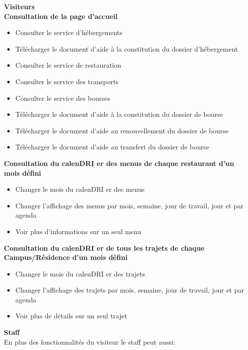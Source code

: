     \textbf{Visiteurs\\}
        \textbf{Consultation de la page d’accueil}
        \begin{itemize}
            \item Consulter le service d'hébergements
            \item Télécharger le document d'aide à la constitution du dossier d'hébergement
            \item Consulter le service de restauration
            \item Consulter le service des transports
            \item Consulter le service des bourses
            \item Télécharger le document d'aide à la constitution du dossier de bourse
            \item Télécharger le document d'aide au renouvellement du dossier de bourse
            \item Télécharger le document d'aide au transfert du dossier de bourse\\
        \end{itemize}

        \textbf{Consultation du calen\acs{DRI} er des menus de chaque restaurant d'un mois défini}
        \begin{itemize}
            \item Changer le mois du calen\acs{DRI} er des menus
            \item Changer l'affichage des menus par mois, semaine, jour de travail, jour et par agenda
            \item Voir plus d'informations sur un seul menu\\
        \end{itemize} 
        
        \textbf{Consultation du calen\acs{DRI} er de tous les trajets de chaque Campus/Résidence d'un mois défini}
        \begin{itemize}
            \item Changer le mois du calen\acs{DRI} er des trajets
            \item Changer l’affichage des trajets par mois, semaine, jour de travail, jour et par agenda
            \item Voir plus de détails sur un seul trajet \\
        \end{itemize}

\textbf{Staff\\}
En plus des fonctionnalités du visiteur le staff peut aussi:\\

